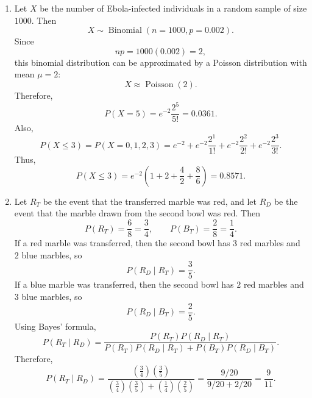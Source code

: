 \documentclass[11pt]{article}
\begin{document}
\begin{enumerate}[label=\textbf{(\arabic*)}, start=9, leftmargin=*]
\begin{enumerate}[label=(\alph*)]
\item For $n=650$ and $\widehat{p}=540/650$,
\[
E=(2.33)\sqrt{\frac{\frac{540}{650}\left(1-\frac{540}{650}\right)}{650}}
=0.034267.
\]
\end{enumerate}

\item Let $X$ be the number of Ebola-infected individuals in a random sample of size $1000$. Then
\[
X\sim \operatorname{Binomial}(n=1000,p=0.002).
\]
Since
\[
np=1000(0.002)=2,
\]
this binomial distribution can be approximated by a Poisson distribution with mean $\mu=2$:
\[
X\approx \operatorname{Poisson}(2).
\]
Therefore,
\[
P(X=5)=e^{-2}\frac{2^5}{5!}=0.0361.
\]
Also,
\[
P(X\le 3)=P(X=0,1,2,3)
=e^{-2}+e^{-2}\frac{2^1}{1!}+e^{-2}\frac{2^2}{2!}+e^{-2}\frac{2^3}{3!}.
\]
Thus,
\[
P(X\le 3)=e^{-2}\left(1+2+\frac{4}{2}+\frac{8}{6}\right)=0.8571.
\]

\item Let $R_T$ be the event that the transferred marble was red, and let $R_D$ be the event that the marble drawn from the second bowl was red. Then
\[
P(R_T)=\frac{6}{8}=\frac{3}{4},
\qquad
P(B_T)=\frac{2}{8}=\frac{1}{4}.
\]
If a red marble was transferred, then the second bowl has $3$ red marbles and $2$ blue marbles, so
\[
P(R_D\mid R_T)=\frac{3}{5}.
\]
If a blue marble was transferred, then the second bowl has $2$ red marbles and $3$ blue marbles, so
\[
P(R_D\mid B_T)=\frac{2}{5}.
\]
Using Bayes' formula,
\[
P(R_T\mid R_D)
=\frac{P(R_T)P(R_D\mid R_T)}{P(R_T)P(R_D\mid R_T)+P(B_T)P(R_D\mid B_T)}.
\]
Therefore,
\[
P(R_T\mid R_D)
=\frac{\left(\frac{3}{4}\right)\left(\frac{3}{5}\right)}{\left(\frac{3}{4}\right)\left(\frac{3}{5}\right)+\left(\frac{1}{4}\right)\left(\frac{2}{5}\right)}
=\frac{9/20}{9/20+2/20}
=\frac{9}{11}.
\]

\end{enumerate}
\end{document}
